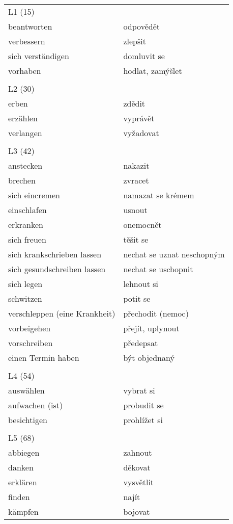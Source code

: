 \documentclass{article}
\begin{document}
 
 \begin{tabular}{ p{5cm}|p{5cm}  }
    L1 (15)\\
    beantworten & odpovědět \\
    verbessern & zlepšit \\
    sich verständigen & domluvit se \\
    vorhaben & hodlat, zamýšlet \\
    \\
    L2 (30)\\
    erben & zdědit \\
    erzählen & vyprávět\\
    verlangen & vyžadovat \\
    \\
    L3 (42) \\
    anstecken & nakazit \\
    brechen & zvracet \\
    sich eincremen & namazat se krémem \\
    einschlafen & usnout \\
    erkranken & onemocnět \\
    sich freuen & těšit se \\
    sich krankschrieben lassen & nechat se uznat neschopným \\
    sich gesundschreiben lassen & nechat se uschopnit \\
    sich legen & lehnout si \\
    schwitzen & potit se \\
    verschleppen (eine Krankheit) & přechodit (nemoc) \\
    vorbeigehen & přejít, uplynout \\
    vorschreiben & předepsat \\
    einen Termin haben & být objednaný \\
    \\
    L4 (54) \\
    auswählen & vybrat si \\
    aufwachen (ist) & probudit se \\
    besichtigen & prohlížet si \\
    \\
    L5 (68) \\
    abbiegen & zahnout \\
    danken & děkovat \\
    erklären & vysvětlit \\
    finden & najít \\
    kämpfen & bojovat \\

\end{tabular}
\end{document}
